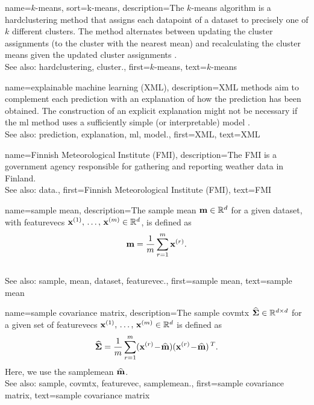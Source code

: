 	
{name={$k$-means}, 
sort={k-means},
	description={The $k$-\glspl{mean} \gls{algorithm} 
		is a \gls{hardclustering} method that assigns each \gls{datapoint} of a \gls{dataset} 
		to precisely one of $k$ different \glspl{cluster}. The method alternates between updating 
		the \gls{cluster} assignments (to the \gls{cluster} with the nearest \gls{mean}) and 
		recalculating the \gls{cluster} \glspl{mean} given the updated \gls{cluster} assignments \cite[Ch. 8]{MLBasics}.
				\\
		See also: \gls{hardclustering}, \gls{cluster}.},
	first={$k$-means},
	text={$k$-means} 
}


{name={explainable machine learning (XML)}, 
	description={XML 
		methods aim to complement each \gls{prediction} with an \gls{explanation} of 
		how the \gls{prediction} has been obtained. The construction of an explicit \gls{explanation} 
		might not be necessary if the \gls{ml} method uses a sufficiently simple (or interpretable) \gls{model} \cite{rudin2019stop}.
				\\
		See also: \gls{prediction}, \gls{explanation}, \gls{ml}, \gls{model}.},
	first={XML},
	text={XML} 
}

{name={Finnish Meteorological Institute (FMI)}, 
	description={The
		FMI is a government agency responsible for gathering 
		and reporting weather \gls{data} in Finland.
				\\
		See also: \gls{data}.},
	first={Finnish Meteorological Institute (FMI)},
	text={FMI} 
}
	
	
{name={sample mean}, 
	description={The \gls{sample} \gls{mean} 
		${\bf m} \in \mathbb{R}^{d}$ for a given \gls{dataset}, with \glspl{featurevec} 
		${\bf x}^{(1)}, \,\ldots, \,{\bf x}^{(m)} \in \mathbb{R}^{d}$, is defined as 
		$${\bf m} = \frac{1}{m} \sum_{r=1}^{m} {\bf x}^{(r)}.$$ 
					\\
		See also: \gls{sample}, \gls{mean}, \gls{dataset}, \gls{featurevec}.},
	first={sample mean},
	text={sample mean} 
}

	
{name={sample covariance matrix}, 
	description={The 
		\gls{sample} \gls{covmtx} $\widehat{\bf \Sigma} \in \mathbb{R}^{d \times d}$ 
		for a given set of \glspl{featurevec} ${\bf x}^{(1)}, \,\ldots, \,{\bf x}^{(m)} \in \mathbb{R}^{d}$ is defined as 
		$$\widehat{\bf \Sigma} = \frac{1}{m} \sum_{r=1}^{m} ({\bf x}^{(r)}\!-\!\widehat{{\bf m}}) ({\bf x}^{(r)}\!-\!\widehat{{\bf m}})\,^{T}.$$ 
		Here, we use the \gls{samplemean} $\widehat{{\bf m}}$. 
				\\
		See also: \gls{sample}, \gls{covmtx}, \gls{featurevec}, \gls{samplemean}.},
	first={sample covariance matrix},
	text={sample covariance matrix} 
}

